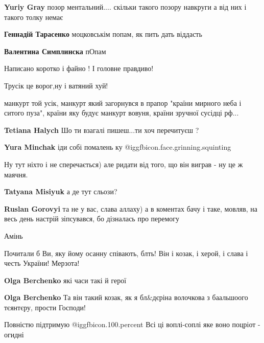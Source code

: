\begin{itemize}
\begin{itemize}
\textbf{Yuriy Gray} позор ментальний.... скільки такого позору навкруги а від них і такого толку немає

\textbf{Геннадій Тарасенко} моцковськім попам, як пить дать віддасть

\textbf{Валентина Симплинска} пОпам
\end{itemize} %

Написано коротко і файно ! І головне правдиво!

Трусік це ворог,ну і ватяний хуй!


манкурт той усік, манкурт який загорнувся в прапор "країни мирного неба і
ситого пуза", країни яку будує манкурт вовуня, країни зручної сусідці рф...

\begin{itemize} %
\textbf{Tetiana Halych} Шо ти взагалі пишеш...ти хоч перечитуєш ?

\textbf{Yura Minchak} іди собі помалень ку @igg{fbicon.face.grinning.squinting} 
\end{itemize} %

Ну тут ніхто і не сперечається) але ридати від того, що він виграв - ну це ж
маячня.

\begin{itemize} %
\textbf{Tatyana Misiyuk} а де тут сльози?

\textbf{Ruslan Gorovyi} та не у вас, слава аллаху) а в коментах бачу і таке, мовляв, на весь день настрій зіпсувався, бо дізналась про перемогу
\end{itemize} %

Амінь

Почитали б Ви, яку йому осанну співають, блть! Він і козак, і херой, і слава і честь України! Мерзота!

\begin{itemize} %
\textbf{Olga Berchenko} які часи такі й герої

\textbf{Olga Berchenko} Та він такий козак, як я бл\&дєріна волочкова з баальшоого тєянтєру, прости Господи!
\end{itemize} %

Повністю підтримую @igg{fbicon.100.percent} 
Всі ці воплі-соплі яке воно поцріот - огидні


\end{itemize}
